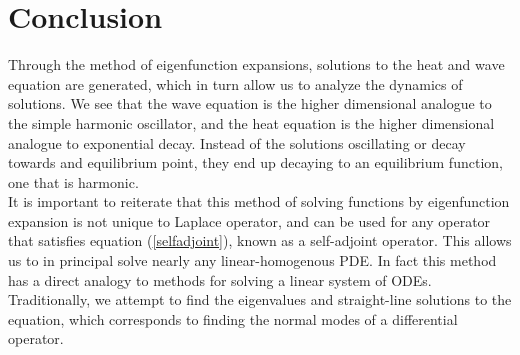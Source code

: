 \documentclass{article}
\begin{document}
\section{Conclusion}
Through the method of eigenfunction expansions, solutions to the heat and wave equation are generated, which in turn allow us to analyze the dynamics of solutions. We see that the wave equation is the higher dimensional analogue to the simple harmonic oscillator, and the heat equation is the higher dimensional analogue to exponential decay. Instead of the solutions oscillating or decay towards and equilibrium point, they end up decaying to an equilibrium function, one that is harmonic.\\
It is important to reiterate that this method of solving functions by eigenfunction expansion is not unique to Laplace operator, and can be used for any operator that satisfies equation (\ref{selfadjoint}), known as a self-adjoint operator. This allows us to in principal solve nearly any linear-homogenous PDE. In fact this method has a direct analogy to methods for solving a linear system of ODEs. Traditionally, we attempt to find the eigenvalues and straight-line solutions to the equation, which corresponds to finding the normal modes of a differential operator.
\newpage
\end{document}
